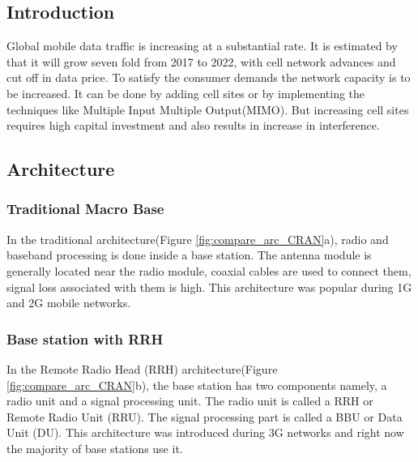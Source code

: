 \documentclass[notitlepage,hidelinks]{article}
\begin{document}
\subsection{Introduction}

Global mobile data traffic is increasing at a substantial rate. 
It is estimated by \textcite{cisco19} that it will grow seven fold
from 2017 to 2022, with cell network advances and cut off in 
data price. To satisfy the consumer demands the network capacity 
is to be increased. It can be done by adding cell sites or by 
implementing the techniques like Multiple Input Multiple 
Output(MIMO). But increasing cell sites requires high capital 
investment and also results in increase in interference.
\nocite{checko14}


\subsection{Architecture}


\subsubsection{Traditional Macro Base}


In the traditional architecture(Figure \ref{fig:compare_arc_CRAN}a), radio and baseband
processing is done inside a base station. The antenna module 
is generally located near the radio module, coaxial cables
are used to connect them, signal loss associated with them is 
high. This architecture was popular during 1G and 2G mobile 
networks.\nocite{checko14}



\subsubsection{Base station with RRH}


In the Remote Radio Head (RRH) architecture(Figure \ref{fig:compare_arc_CRAN}b), the base station 
has two components namely, a radio unit and a signal processing 
unit. The radio unit is called a RRH or Remote Radio Unit (RRU).
The signal processing part is called a BBU or Data Unit (DU). 
This architecture was introduced during 3G networks and right now 
the majority of base stations use it.\\
\end{document}
